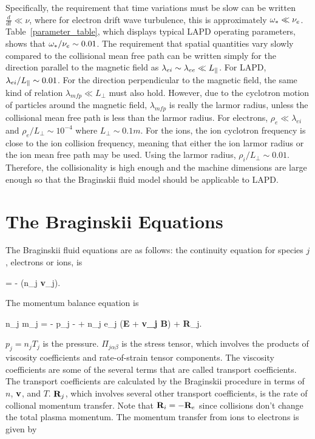 Specifically, the requirement that time variations must be slow can be written $\frac{d}{dt} \ll \nu$, where for electron drift wave turbulence, this is approximately $\omega_* \ll \nu_{e}$.
Table~\ref{parameter_table}, which displays typical LAPD operating parameters, shows that $\omega_* / \nu_{e} \sim 0.01$. The requirement that spatial quantities vary slowly compared to the collisional
mean free path can be written simply for the direction parallel to the magnetic field as $\lambda_{ei} \sim \lambda_{ee} \ll L_\parallel$. 
For LAPD, $\lambda_{ei} / L_\parallel \sim 0.01$. For the direction perpendicular
to the magnetic field, the same kind of relation $\lambda_{mfp} \ll L_\perp$ must also hold. However, due to the cyclotron motion of particles around the magnetic field, $\lambda_{mfp}$ is really
the larmor radius, unless the collisional mean free path is less than the larmor radius. For electrons, $\rho_e \ll \lambda_{ei}$ and $\rho_e/L_\perp \sim 10^{-4}$ where $L_\perp \sim 0.1 m$. 
For the ions, the ion cyclotron frequency is close to the ion collision frequency, meaning that either the ion larmor radius or the ion mean free path may be used. 
Using the larmor radius, $\rho_i/L_\perp \sim 0.01$. Therefore, the collisionality is high enough and the machine dimensions are large enough so that the Braginskii fluid model should be
applicable to LAPD.

\section{The Braginskii Equations}
\label{s_braginskii_eqns}

The Braginskii fluid equations are as follows: 
the continuity equation for species $j$, electrons or ions, is~\cite{wesson2004,Braginskii1965}

\beq
\label{brag_cont}
 = - \grad \cdot (n_j {\bf v}_j).
\eeq

The momentum balance equation is

\beq
\label{brag_mom}
n_j m_j  = - \grad p_j -  + n_j e_j ({\bf E} + {\bf v_j \times B}) + {\bf R}_j.
\eeq

$p_j = n_j T_j$ is the pressure.
$\Pi_{j \alpha \beta}$ is the stress tensor, which involves the products of viscosity coefficients and rate-of-strain tensor components. 
The viscosity coefficients are some of the several terms that are called transport coefficients. The transport coefficients are calculated by the Braginskii procedure in terms of $n$, ${\bf v}$,
and $T$.
${\bf R}_j$, which involves several other transport coefficients, is the rate of collional momentum transfer.
Note that ${\bf R}_i = - {\bf R}_e$ since collisions don't change the total plasma momentum. The momentum transfer from ions to electrons is given by

